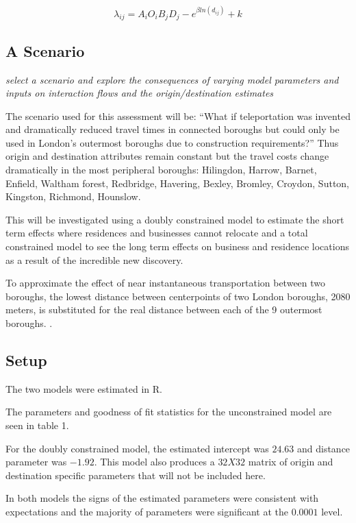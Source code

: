 \documentclass[11pt]{article} %
\begin{document}
\begin{equation}
\lambda_{ij} = A_i O_i  B_j D_j - e ^{ \beta ln( d_{ij})} + k
\end{equation}



\subsection{A Scenario}

\textit{select a scenario and explore the consequences of varying model parameters and inputs on interaction flows and the origin/destination estimates}

The scenario used for this assessment will be: ``What if teleportation  was invented and dramatically reduced travel times in connected boroughs but could only be used in London's outermost boroughs due to construction requirements?'' Thus origin and destination attributes remain constant but the travel costs change dramatically in the most peripheral boroughs: Hilingdon, Harrow, Barnet, Enfield, Waltham forest, Redbridge, Havering, Bexley, Bromley, Croydon, Sutton, Kingston, Richmond, Hounslow. 

This will be investigated using a doubly constrained model to estimate the short term effects where residences and businesses cannot relocate and a total constrained model to see the long term effects on business and residence locations as a result of the incredible new discovery. 

To approximate the effect of near instantaneous transportation between two boroughs, the lowest distance between centerpoints of two London boroughs, 2080 meters, is substituted for the real distance between each of the 9 outermost boroughs. . 

\subsection{Setup}

The two models were estimated in R. 

The parameters and goodness of fit statistics for the unconstrained model are seen in table 1. 

For the doubly constrained model, the estimated intercept was $24.63$ and distance parameter was $-1.92$. This model also produces a $32 X 32 $ matrix of origin and destination specific parameters that will not be included here. 

In both models the signs of the estimated parameters were consistent with expectations and the majority of parameters were significant at the $0.0001$ level.
\end{document}
